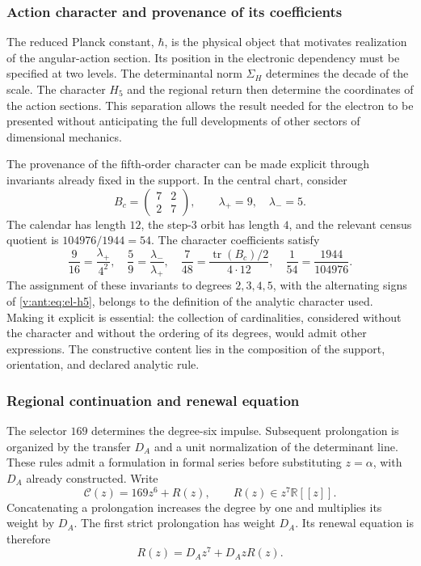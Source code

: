 \subsubsection{Action character and provenance of its coefficients}
\label{v:ant:sec:revision-planck}

The reduced Planck constant, \(\hbar\), is the physical object
that motivates realization of the angular-action section. Its position in
the electronic dependency must be specified at two levels. The determinantal
norm \(\Sigma_H\) determines the decade of the scale. The character
\(H_5\) and the regional return then determine the coordinates of the
action sections. This separation allows the result needed
for the electron to be presented without anticipating the full developments of
other sectors of dimensional mechanics.

The provenance of the fifth-order character can be made explicit through
invariants already fixed in the support. In the central chart, consider
\[
 B_c=\begin{pmatrix}7&2\\2&7\end{pmatrix},
 \qquad \lambda_+=9,\quad\lambda_-=5.
\]
The calendar has length \(12\), the step-\(3\) orbit has
length \(4\), and the relevant census quotient is
\(104976/1944=54\). The character coefficients satisfy
\begin{equation}
 \frac9{16}=\frac{\lambda_+}{4^2},\quad
 \frac59=\frac{\lambda_-}{\lambda_+},\quad
 \frac7{48}=\frac{\operatorname{tr}(B_c)/2}{4\cdot12},\quad
 \frac1{54}=\frac{1944}{104976}.
 \label{v:ant:eq:revision-h5-coeficientes}
\end{equation}
The assignment of these invariants to degrees \(2,3,4,5\), with the
alternating signs of \eqref{v:ant:eq:el-h5}, belongs to the definition of the
analytic character used. Making it explicit is essential: the collection of
cardinalities, considered without the character and without the ordering of its degrees,
would admit other expressions. The constructive content lies in the
composition of the support, orientation, and declared analytic rule.

\subsubsection{Regional continuation and renewal equation}

The selector \(169\) determines the degree-six impulse. Subsequent
prolongation is organized by the transfer \(D_A\) and a unit
normalization of the determinant line. These rules admit a formulation
in formal series before substituting \(z=\alpha\), with \(D_A\) already
constructed. Write
\[
 \mathscr C(z)=169z^6+R(z),\qquad R(z)\in z^7\mathbb R[[z]].
\]
Concatenating a prolongation increases the degree by one and
multiplies its weight by \(D_A\). The first strict prolongation has
weight \(D_A\). Its renewal equation is therefore
\begin{equation}
 R(z)=D_Az^7+D_AzR(z).
 \label{v:ant:eq:revision-renovacion}
\end{equation}

